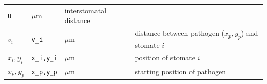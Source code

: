 \documentclass[utf8]{frontiersSCNS}
\begin{document}
\begin{longtable}[]{@{}llll@{}}
\begin{minipage}[t]{0.09\columnwidth}
\texttt{U}\strut
\end{minipage} & \begin{minipage}[t]{0.11\columnwidth}\raggedright
\(\mu\textrm{m}\)\strut
\end{minipage} & \begin{minipage}[t]{0.59\columnwidth}\raggedright
interstomatal distance\strut
\end{minipage}\tabularnewline
\begin{minipage}[t]{0.09\columnwidth}\raggedright
\(v_i\)\strut
\end{minipage} & \begin{minipage}[t]{0.09\columnwidth}\raggedright
\texttt{v\_i}\strut
\end{minipage} & \begin{minipage}[t]{0.11\columnwidth}\raggedright
\(\mu\textrm{m}\)\strut
\end{minipage} & \begin{minipage}[t]{0.59\columnwidth}\raggedright
distance between pathogen (\(x_p,y_p\)) and stomate \(i\)\strut
\end{minipage}\tabularnewline
\begin{minipage}[t]{0.09\columnwidth}\raggedright
\(x_i,y_i\)\strut
\end{minipage} & \begin{minipage}[t]{0.09\columnwidth}\raggedright
\texttt{x\_i,y\_i}\strut
\end{minipage} & \begin{minipage}[t]{0.11\columnwidth}\raggedright
\(\mu\textrm{m}\)\strut
\end{minipage} & \begin{minipage}[t]{0.59\columnwidth}\raggedright
position of stomate \(i\)\strut
\end{minipage}\tabularnewline
\begin{minipage}[t]{0.09\columnwidth}\raggedright
\(x_p,y_p\)\strut
\end{minipage} & \begin{minipage}[t]{0.09\columnwidth}\raggedright
\texttt{x\_p,y\_p}\strut
\end{minipage} & \begin{minipage}[t]{0.11\columnwidth}\raggedright
\(\mu\textrm{m}\)\strut
\end{minipage} & \begin{minipage}[t]{0.59\columnwidth}\raggedright
starting position of pathogen\strut
\end{minipage}\tabularnewline
\bottomrule
\end{longtable}
\end{document}
